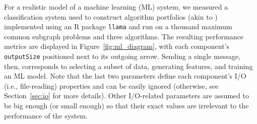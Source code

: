 \documentclass{article}
\begin{document}
For a realistic model of a machine learning (ML) system, we measured a
classification system used to construct algorithm portfolios (akin to
\cite{DBLP:conf/lion/KotthoffMS16}) implemented using an R package
\texttt{llama} \cite{kotthoff_llama_2013} and run on a thousand maximum common
subgraph problems and three algorithms. The resulting performance metrics are
displayed in Figure~\ref{fig:ml_diagram}, with each component's
\texttt{outputSize} positioned next to its outgoing arrow. Sending a single
message, then, corresponds to selecting a subset of data, generating features,
and training an ML model. Note that the last two parameters define each
component's I/O (i.e., file-reading) properties and can be easily ignored
(otherwise, see Section~\ref{sec:io} for more details). Other I/O-related
parameters are assumed to be big enough (or small enough) so that their exact
values are irrelevant to the performance of the system.
\end{document}
